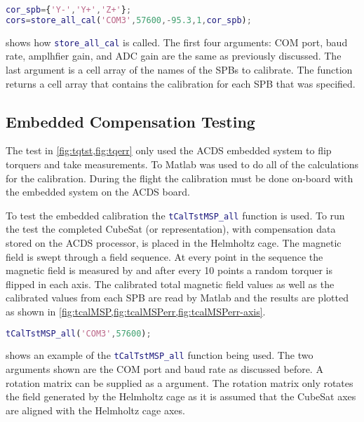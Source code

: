 \begin{lstlisting}[style=code,caption={Generating and sending compensation data to the \ac{ACDS}},label={lst:st-cal},language=Matlab]
cor_spb={'Y-','Y+','Z+'};
cors=store_all_cal('COM3',57600,-95.3,1,cor_spb);
\end{lstlisting}

 shows how \lstinline[style=code,language=Matlab]$store_all_cal$ is called. The first four arguments: COM port, baud rate, amplhfier gain, and \ac{ADC} gain are the same as previously discussed. The last argument is a cell array of the names of the \acp{SPB} to calibrate. The function returns a cell array that contains the calibration for each \ac{SPB} that was specified.

\subsection{Embedded Compensation Testing}

The test in \cref{fig:tqtst,fig:tqerr} only used the \ac{ACDS} embedded system to flip torquers and take measurements. To Matlab was used to do all of the calculations for the calibration. During the flight the calibration must be done on-board with the embedded system on the \ac{ACDS} board.

To test the embedded calibration the \lstinline[style=code,language=Matlab]$tCalTstMSP_all$ function is used. To run the test the completed CubeSat (or representation), with compensation data stored on the \ac{ACDS} processor, is placed in the Helmholtz cage. The magnetic field is swept through a field sequence. At every point in the sequence the magnetic field is measured by and after every 10 points a random torquer is flipped in each axis. The calibrated total magnetic field values as well as the calibrated values from each \ac{SPB} are read by Matlab and the results are plotted as shown in \cref{fig:tcalMSP,fig:tcalMSPerr,fig:tcalMSPerr-axis}.

\begin{lstlisting}[style=code,caption={Testing the on-board calibration},label={lst:st-MSPcal},language=Matlab]
tCalTstMSP_all('COM3',57600);
\end{lstlisting}

 shows an example of the \lstinline[style=code,language=Matlab]$tCalTstMSP_all$ function being used. The two arguments shown are the COM port and baud rate as discussed before. A rotation matrix can be supplied as a  argument. The rotation matrix only rotates the field generated by the Helmholtz cage as it is assumed that the CubeSat axes are aligned with the Helmholtz cage axes.

